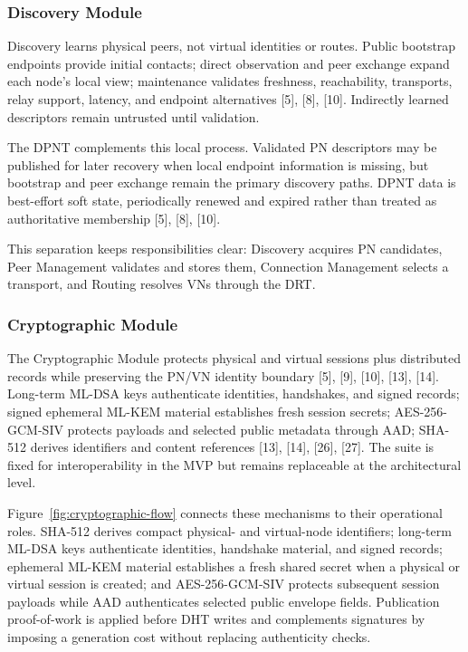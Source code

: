 \documentclass[12pt,a4paper]{article}
\begin{document}
\subsubsection{Discovery Module}


\thesispeerdiscoverytikz


Discovery learns physical peers, not virtual identities or routes. Public bootstrap endpoints provide initial contacts; direct observation and peer exchange expand each node's local view; maintenance validates freshness, reachability, transports, relay support, latency, and endpoint alternatives [5], [8], [10]. Indirectly learned descriptors remain untrusted until validation.

The DPNT complements this local process. Validated PN descriptors may be published for later recovery when local endpoint information is missing, but bootstrap and peer exchange remain the primary discovery paths. DPNT data is best-effort soft state, periodically renewed and expired rather than treated as authoritative membership [5], [8], [10].

This separation keeps responsibilities clear: Discovery acquires PN candidates, Peer Management validates and stores them, Connection Management selects a transport, and Routing resolves VNs through the DRT.




\subsubsection{Cryptographic Module}

The Cryptographic Module protects physical and virtual sessions plus distributed records while preserving the PN/VN identity boundary [5], [9], [10], [13], [14]. Long-term ML-DSA keys authenticate identities, handshakes, and signed records; signed ephemeral ML-KEM material establishes fresh session secrets; AES-256-GCM-SIV protects payloads and selected public metadata through AAD; SHA-512 derives identifiers and content references [13], [14], [26], [27]. The suite is fixed for interoperability in the MVP but remains replaceable at the architectural level.

Figure~\ref{fig:cryptographic-flow} connects these mechanisms to their operational roles. SHA-512 derives compact physical- and virtual-node identifiers; long-term ML-DSA keys authenticate identities, handshake material, and signed records; ephemeral ML-KEM material establishes a fresh shared secret when a physical or virtual session is created; and AES-256-GCM-SIV protects subsequent session payloads while AAD authenticates selected public envelope fields. Publication proof-of-work is applied before DHT writes and complements signatures by imposing a generation cost without replacing authenticity checks.
\end{document}
